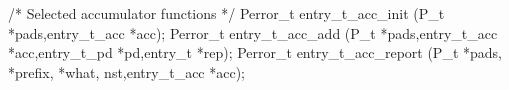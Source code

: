 \begin{code}
/* Selected accumulator functions */
Perror\_t entry\_t\_acc\_init (P\_t *pads,entry\_t\_acc *acc);
Perror\_t entry\_t\_acc\_add (P\_t *pads,entry\_t\_acc *acc,entry\_t\_pd *pd,entry\_t *rep);
Perror\_t entry\_t\_acc\_report (P\_t *pads,  *prefix,  *what,
                              nst,entry\_t\_acc *acc);
\end{code}
